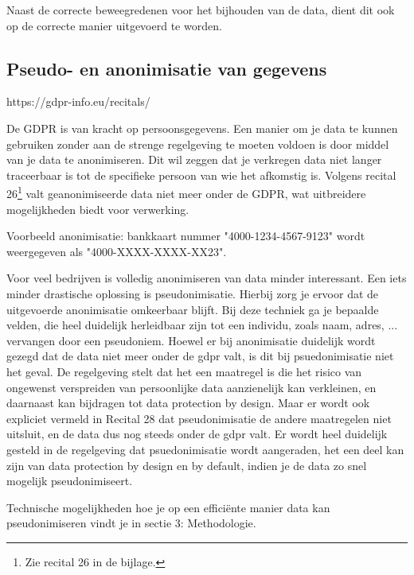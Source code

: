 \setlength{\leftskip}{0pt}

Naast de correcte beweegredenen voor het bijhouden van de data, dient dit ook op de correcte manier uitgevoerd te worden. 






\subsection{Pseudo- en anonimisatie van gegevens}
https://gdpr-info.eu/recitals/


De GDPR is van kracht op persoonsgegevens. Een manier om je data te kunnen gebruiken zonder aan de strenge regelgeving te moeten voldoen is door middel van je data te anonimiseren. Dit wil zeggen dat je verkregen data niet langer traceerbaar is tot de specifieke persoon van wie het afkomstig is. Volgens recital 26\footnote{Zie recital 26 in de bijlage.} valt geanonimiseerde data niet meer onder de GDPR, wat uitbreidere mogelijkheden biedt voor verwerking. 

Voorbeeld anonimisatie: bankkaart nummer "4000-1234-4567-9123" wordt weergegeven als "4000-XXXX-XXXX-XX23". 

Voor veel bedrijven is volledig anonimiseren van data minder interessant. Een iets minder drastische oplossing is pseudonimisatie. Hierbij zorg je ervoor dat de uitgevoerde anonimisatie omkeerbaar blijft.  
Bij deze techniek ga je bepaalde velden, die heel duidelijk herleidbaar zijn tot een individu, zoals naam, adres, ... vervangen door een pseudoniem.
Hoewel er bij anonimisatie duidelijk wordt gezegd dat de data niet meer onder de gdpr valt, is dit bij psuedonimisatie niet het geval. De regelgeving stelt dat het een maatregel is die het risico van ongewenst verspreiden van persoonlijke data aanzienelijk kan verkleinen, en daarnaast kan bijdragen tot data protection by design. Maar er wordt ook expliciet vermeld in Recital 28 dat pseudonimisatie de andere maatregelen niet uitsluit, en de data dus nog steeds onder de gdpr valt. 
Er wordt heel duidelijk gesteld in de regelgeving dat psuedonimisatie wordt aangeraden, het een deel kan zijn van data protection by design en by default, indien je de data zo snel mogelijk pseudonimiseert. 

Technische mogelijkheden hoe je op een efficiënte manier data kan pseudonimiseren vindt je in sectie 3: Methodologie. 


